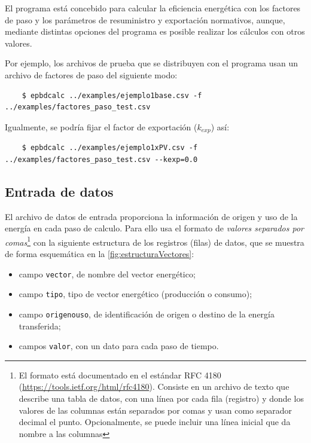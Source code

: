 \documentclass[10pt,notitlepage,oneside,a4paper]{article}
\begin{document}
El programa está concebido para calcular la eficiencia energética con los factores de paso y los parámetros de resuministro y exportación normativos, aunque, mediante distintas opciones del programa es posible realizar los cálculos con otros valores.

Por ejemplo, los archivos de prueba que se distribuyen con el programa usan un archivo de factores de paso del siguiente modo:

\begin{Verbatim}
	$ epbdcalc ../examples/ejemplo1base.csv -f ../examples/factores_paso_test.csv 
\end{Verbatim}

Igualmente, se podría fijar el factor de exportación ($k_{exp}$) así:

\begin{Verbatim}
	$ epbdcalc ../examples/ejemplo1xPV.csv -f ../examples/factores_paso_test.csv --kexp=0.0
\end{Verbatim}

\subsection{Entrada de datos}

El archivo de datos de entrada proporciona la información de origen y uso de la energía en cada paso de calculo. Para ello usa el formato de \textit{valores separados por comas}\footnote{El formato está documentado en el estándar RFC 4180 (\url{https://tools.ietf.org/html/rfc4180}). Consiste en un archivo de texto que describe una tabla de datos, con una línea por cada fila (registro) y donde los valores de las columnas están separados por comas y usan como separador decimal el punto. Opcionalmente, se puede incluir una línea inicial que da nombre a las columnas} con la siguiente estructura de los registros (filas) de datos, que se muestra de forma esquemática en la \autoref{fig:estructuraVectores}:

\begin{itemize}
\item campo \texttt{vector}, de nombre del vector energético;
\item campo \texttt{tipo}, tipo de vector energético (producción o consumo);
\item campo \texttt{origenouso}, de identificación de origen o destino de la energía transferida;
\item campos \texttt{valor}, con un dato para cada paso de tiempo.
\end{itemize}
\end{document}
